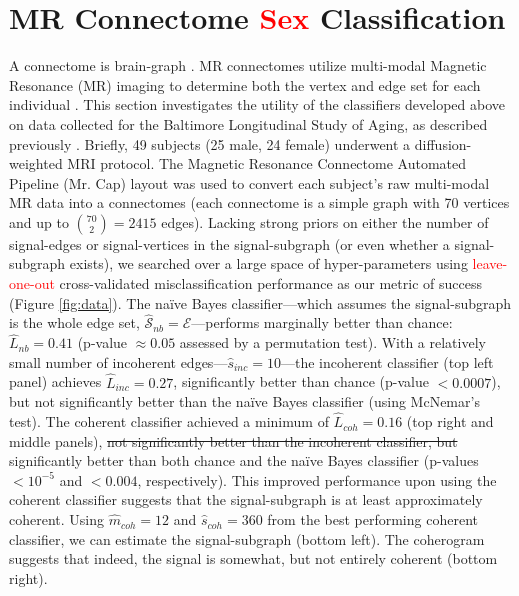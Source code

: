 \documentclass[10pt,journal,cspaper,compsoc]{IEEEtran}
\providecommand{\tr}[1]{\textcolor{red}{#1}}
\providecommand{\mc}[1]{\mathcal{#1}}
\providecommand{\wh}[1]{\widehat{#1}}
\providecommand{\mhc}[1]{\widehat{\mathcal{#1}}}
\begin{document}

\section{MR Connectome \tr{Sex} Classification} %
\label{sub:mr_connectome_classification}

A connectome is brain-graph \cite{Sporns2010}.  MR connectomes utilize multi-modal Magnetic Resonance (MR) imaging to determine both the vertex and edge set for each individual \cite{Hagmann2010}.  This section investigates the utility of the classifiers developed above on data collected for the Baltimore Longitudinal Study of Aging, as described previously \cite{OHBM10}.  Briefly, 49 subjects (25 male, 24 female) underwent a diffusion-weighted MRI protocol. The Magnetic Resonance Connectome Automated Pipeline (Mr. Cap) layout was used to convert each subject's raw multi-modal MR data into a connectomes \cite{MRCAP11} (each connectome is a simple graph with 70 vertices and up to $\binom{70}{2}=2415$ edges). Lacking strong priors on either the number of signal-edges or signal-vertices in the signal-subgraph (or even whether a signal-subgraph exists), we searched over a large space of hyper-parameters using \tr{leave-one-out} cross-validated misclassification performance as our metric of success (Figure \ref{fig:data}).  The na\"ive Bayes classifier---which assumes the signal-subgraph is the whole edge set, $\mhc{S}_{nb}=\mc{E}$---performs marginally better than chance: $\wh{L}_{nb}=0.41$ (p-value $\approx 0.05$ assessed by a permutation test).  With a relatively small number of incoherent edges---$\wh{s}_{inc}=10$---the incoherent classifier (top left panel) achieves $\wh{L}_{inc}=0.27$, significantly better than chance (p-value $<0.0007$), but not significantly better than the na\"ive Bayes classifier (using McNemar's test).  The coherent classifier achieved a minimum of $\wh{L}_{coh}=0.16$ (top right and middle panels), 
\sout{not significantly better than the incoherent classifier, but }
significantly better than both chance and the na\"ive Bayes classifier (p-values $<10^{-5}$ and $<0.004$, respectively).  This improved performance upon using the coherent classifier suggests that the signal-subgraph is at least approximately coherent. Using $\wh{m}_{coh}=12$ and $\wh{s}_{coh}=360$ from the best performing coherent classifier, we can estimate the signal-subgraph (bottom left).  The coherogram suggests that indeed, the signal is somewhat, but not entirely coherent (bottom right).
\end{document}
